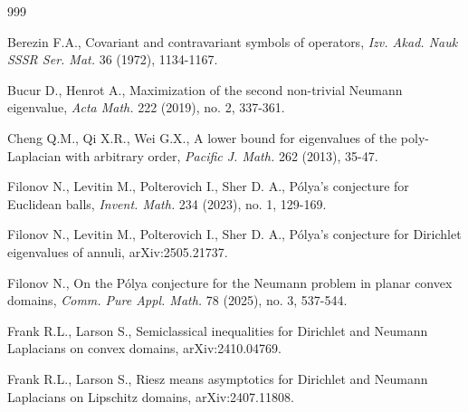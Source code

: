 \documentclass[11pt,twoside, leqno]{article}
\numberwithin{equation}{section}
\begin{document}
\begin{thebibliography}{999}


\vspace{-0.3cm}
  Berezin F.A., Covariant and contravariant symbols of operators, {\em Izv. Akad. Nauk
SSSR Ser. Mat.} 36 (1972), 1134-1167.


\vspace{-0.3cm}
 Bucur D., Henrot A.,
 Maximization of the second non-trivial Neumann eigenvalue,
{\em Acta Math.} 222 (2019), no. 2, 337-361.


\vspace{-0.3cm}
Cheng Q.M., Qi X.R., Wei G.X.,
A lower bound for eigenvalues of the poly-Laplacian with arbitrary order,
{\em Pacific J. Math.} 262 (2013), 35-47.



\vspace{-0.3cm}
Filonov N., Levitin M., Polterovich I., Sher D. A.,
 P\'olya's conjecture for Euclidean balls,
{\em Invent. Math.} 234 (2023), no. 1, 129-169.

\vspace{-0.3cm}
Filonov N., Levitin M., Polterovich I., Sher D. A.,
P\'olya's conjecture for Dirichlet eigenvalues of annuli,
arXiv:2505.21737.



\vspace{-0.3cm}
Filonov N., On the P\'olya conjecture for the Neumann problem in planar convex domains,
{\em Comm. Pure Appl. Math.} 78 (2025), no. 3, 537-544.


\vspace{-0.3cm}
 Frank R.L., Larson S.,
Semiclassical inequalities for Dirichlet and Neumann Laplacians on convex domains,
arXiv:2410.04769.

\vspace{-0.3cm}
 Frank R.L., Larson S.,
Riesz means asymptotics for Dirichlet and Neumann Laplacians on Lipschitz domains, arXiv:2407.11808.


\end{thebibliography}
\end{document}
